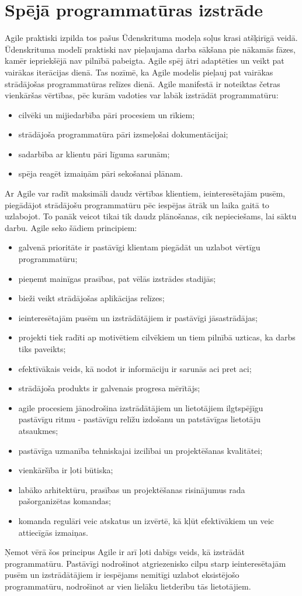 \section{Spējā programmatūras izstrāde}
Agile praktiski izpilda tos pašus Ūdenskrituma modeļa soļus krasi atšķirīgā veidā. Ūdenskrituma modelī praktiski nav pieļaujama darba sākšana pie nākamās fāzes, kamēr iepriekšējā nav pilnībā pabeigta. Agile spēj ātri adaptēties un veikt pat vairākas iterācijas dienā. Tas nozīmē, ka Agile modelis pieļauj pat vairākas strādājošas programmatūras relīzes dienā.
Agile manifestā ir noteiktas četras vienkāršas vērtības, pēc kurām vadoties var labāk izstrādāt programmatūru:
\begin{itemize}
	\item cilvēki un mijiedarbība pāri procesiem un rīkiem;
	\item strādājoša programmatūra pāri izsmeļošai dokumentācijai;
	\item sadarbība ar klientu pāri līguma sarunām;
	\item spēja reagēt izmaiņām pāri sekošanai plānam.
\end{itemize}
Ar Agile var radīt maksimāli daudz vērtības klientiem, ieinteresētajām pusēm, piegādājot strādājošu programmatūru pēc iespējas ātrāk un laika gaitā to uzlabojot. To panāk veicot tikai tik daudz plānošanas, cik nepieciešams, lai sāktu darbu.
Agile seko šādiem principiem:
\begin{itemize}
	\item galvenā prioritāte ir pastāvīgi klientam piegādāt un uzlabot vērtīgu programmatūru;
	\item pieņemt mainīgas prasības, pat vēlās izstrādes stadijās;
	\item bieži veikt strādājošas aplikācijas relīzes;
	\item ieinteresētajām pusēm un izstrādātājiem ir pastāvīgi jāsastrādājas;
	\item projekti tiek radīti ap motivētiem cilvēkiem un tiem pilnībā uzticas, ka darbs tiks paveikts;
	\item efektīvākais veids, kā nodot ir informāciju ir sarunās aci pret aci;
	\item strādājoša produkts ir galvenais progresa mērītājs;
	\item agile procesiem jānodrošina izstrādātājiem un lietotājiem ilgtspējīgu pastāvīgu ritmu - pastāvīgu relīžu izdošanu un patstāvīgas lietotāju atsaukmes;
	\item pastāvīga uzmanība tehniskajai izcilībai un projektēšanas kvalitātei;
	\item vienkāršība ir ļoti būtiska;
	\item labāko arhitektūru, prasības un projektēšanas risinājumus rada pašorganizētas komandas;
	\item komanda regulāri veic atskatus un izvērtē, kā kļūt efektīvākiem un veic attiecīgās izmaiņas.
\end{itemize}
Ņemot vērā šos principus Agile ir arī ļoti dabīgs veids, kā izstrādāt programmatūru. Pastāvīgi nodrošinot atgriezenisko cilpu starp ieinteresētajām pusēm un izstrādātājiem ir iespējams nemitīgi uzlabot eksistējošo programmatūru, nodrošinot ar vien lielāku lietderību tās lietotājiem.
\cite{agile-man}

